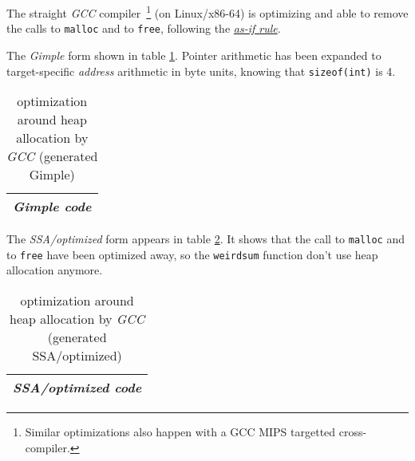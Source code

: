  The straight \emph{GCC} compiler~\footnote{Similar optimizations also
   happen with a GCC MIPS targetted cross-compiler.} (on Linux/x86-64)
 is optimizing and able to remove the calls to \texttt{malloc} and to
 \texttt{free}, following the  \href{https://en.wikipedia.org/wiki/As-if\_rule}{\emph{as-if rule}}.


The \emph{Gimple} form shown in table
\ref{tab:mallfreegimple}. Pointer arithmetic has been expanded to
target-specific \emph{address} arithmetic in byte units, knowing that
\texttt{sizeof(int)} is 4.



 \smallskip

\begin{table}[H]
\caption{\label{tab:mallfreegimple} optimization around heap
  allocation by \emph{GCC} (generated Gimple)}
   \medskip
  \begin{center}
    \begin{relsize}{-1.5}
     \begin{tabular}{c}
       \\ 
       \textbf{\emph{Gimple code}} \\ 
       \hline
     \end{tabular}
    \end{relsize}
  \end{center}
\end{table}

\medskip

The \emph{SSA/optimized} form appears in table
\ref{tab:mallfreeoptim}. It shows that the call to \texttt{malloc} and
to \texttt{free} have been optimized away, so the \texttt{weirdsum}
function don't use heap allocation anymore.

\begin{table}[H]
\caption{\label{tab:mallfreeoptim} optimization around heap allocation
  by \emph{GCC} (generated SSA/optimized)}
   \medskip
  \begin{center}
    \begin{relsize}{-1.5}
     \begin{tabular}{c}
       \\ 
       \textbf{\emph{SSA/optimized code}} \\ 
       \hline
     \end{tabular}
    \end{relsize}
  \end{center}
\end{table}

